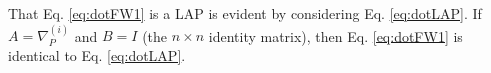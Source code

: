 \documentclass[10pt,journal,cspaper,compsoc]{IEEEtran}
\begin{document}
That Eq. \eqref{eq:dotFW1} is a LAP is evident by considering Eq. \eqref{eq:dotLAP}.  If $A=\nabla_P^{(i)}$ and $B=I$ (the $n\times n$ identity matrix), then Eq. \eqref{eq:dotFW1} is identical to Eq. \eqref{eq:dotLAP}.


\end{document}

